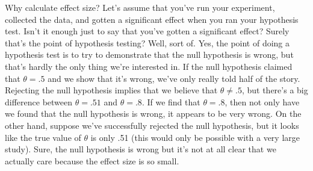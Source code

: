 \documentclass[
  a4paper,
]{book}
\begin{document}
\begin{table}

\caption{\label{tbl-tab9-6}A crude guide to understanding the
relationship between statistical significance and effect sizes.
Basically, if you don't have a significant result then the effect size
is pretty meaningless because you don't have any evidence that it's even
real. On the other hand, if you do have a significant effect but your
effect size is small then there's a pretty good chance that your result
(although real) isn't all that interesting. It does depend a lot on what
exactly you're studying; small effects can be of massive practical
importance in some situations. So don't take this table too seriously --
it's a rough guide at best}

\centering
{}

\end{table}%

Why calculate effect size? Let's assume that you've run your experiment,
collected the data, and gotten a significant effect when you ran your
hypothesis test. Isn't it enough just to say that you've gotten a
significant effect? Surely that's the point of hypothesis testing? Well,
sort of. Yes, the point of doing a hypothesis test is to try to
demonstrate that the null hypothesis is wrong, but that's hardly the
only thing we're interested in. If the null hypothesis claimed that
\(\theta = .5\) and we show that it's wrong, we've only really told half
of the story. Rejecting the null hypothesis implies that we believe that
\(\theta \neq .5\), but there's a big difference between
\(\theta = .51\) and \(\theta = .8\). If we find that \(\theta = .8\),
then not only have we found that the null hypothesis is wrong, it
appears to be very wrong. On the other hand, suppose we've successfully
rejected the null hypothesis, but it looks like the true value of
\(\theta\) is only .51 (this would only be possible with a very large
study). Sure, the null hypothesis is wrong but it's not at all clear
that we actually care because the effect size is so small.
\end{document}
